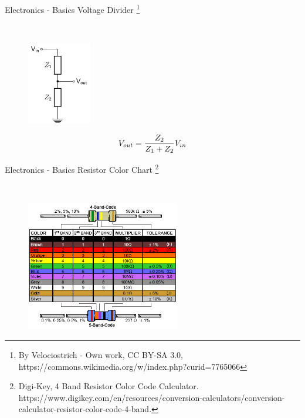 \documentclass{beamer}
\newcommand\blfootnote[1]{%
  \begingroup
  \renewcommand\thefootnote{}\footnote{#1}%
  \addtocounter{footnote}{-1}%
  \endgroup
}
\begin{document}
\begin{frame}{Electronics - Basics}
    Voltage Divider\blfootnote{By Velociostrich - Own work, CC BY-SA 3.0, https://commons.wikimedia.org/w/index.php?curid=7765066}\\
    \vspace{5mm}
    \begin{figure}[h]
        \includegraphics[width=0.25\textwidth]{voltage_divider.png}
    \end{figure}
    \begin{equation*}
    \Large
        V_{out} = \frac{Z_2}{Z_1+Z_2}V_{in}
    \end{equation*}
\end{frame}

\begin{frame}{Electronics - Basics}
   Resistor Color Chart\blfootnote{Digi-Key, 4 Band Resistor Color Code Calculator. https://www.digikey.com/en/resources/conversion-calculators/conversion-calculator-resistor-color-code-4-band.}\\
    \vspace{5mm}
    \begin{figure}[h]
        \includegraphics[width=0.6\textwidth]{resistor-color-chart.png}
    \end{figure}
\end{frame}
\end{document}
